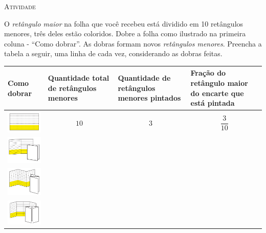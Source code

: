 \documentclass[10 pt,usenames,dvipsnames, oneside]{article}
\begin{document}
\bigskip
\begin{center}
{\large \scshape Atividade}
\end{center}
\fi

O \textit{retângulo maior} na folha que você recebeu está dividido em 10 retângulos menores, três deles estão coloridos. Dobre a folha como ilustrado na primeira coluna - ``Como dobrar''. As dobras formam novos \textit{retângulos menores}. Preencha a tabela a seguir, uma linha de cada vez, considerando as dobras feitas.
\begin{longtable}{|m{}|m{}|m{}|m{}|}
\hline
Como dobrar  &  Quantidade total de retângulos menores & Quantidade de retângulos menores pintados  &   Fração do retângulo maior do encarte que está pintada  \\
\hline \hline
\endhead
\includegraphics[width=100pt, keepaspectratio]{ativ2_fig01.png}      & $$10$$ & $$3$$&  $$\dfrac{3}{10}$$   \\
\hline
\includegraphics[width=100pt, keepaspectratio]{ativ2_fig02.png}                                                                              & &  &  \\
\hline
\includegraphics[width=100pt, keepaspectratio]{ativ2_fig03.png}     &  &   &  \\
\hline
\includegraphics[width=100pt, keepaspectratio]{ativ2_fig04.png} & &&\\

\end{longtable}
\end{document}
